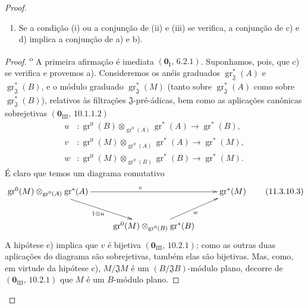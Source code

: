 \begin{proof}
\begin{lemma}[11.3.10.2]
\begin{enumerate}[label=\arabic{enumi}\textsuperscript{o}]

\item Se a condição (i) ou a conjunção
de (ii) e (iii) se verifica, a
conjunção de c) e d) implica a
conjunção de a) e b).
\end{enumerate}
\end{lemma}

\begin{proof}
\textsuperscript{o} A primeira
afirmação é imediata
$(\mathbf 0_{\mathrm I},\,6.2.1)$.
Suponhamos, pois, que c) se verifica
e provemos a). Consideremos os anéis
graduados $\operatorname{gr}_{\mathfrak J}^*(A)$
e $\operatorname{gr}_{\mathfrak J}^*(B)$,
e o módulo graduado
$\operatorname{gr}_{\mathfrak J}^*(M)$
(tanto sobre $\operatorname{gr}_{\mathfrak J}^*(A)$
como sobre $\operatorname{gr}_{\mathfrak J}^*(B)$),
relativos às filtrações
$\mathfrak J$-pré-ádicas, bem como as
aplicações canônicas sobrejetivas
$(\mathbf 0_{\mathrm{III}},\,10.1.1.2)$
\begin{align*}
u&:\operatorname{gr}^0(B)
\otimes_{\operatorname{gr}^0(A)}
\operatorname{gr}^*(A)
\longrightarrow\operatorname{gr}^*(B),\\
v&:\operatorname{gr}^0(M)
\otimes_{\operatorname{gr}^0(A)}
\operatorname{gr}^*(A)
\longrightarrow\operatorname{gr}^*(M),\\
w&:\operatorname{gr}^0(M)
\otimes_{\operatorname{gr}^0(B)}
\operatorname{gr}^*(B)
\longrightarrow\operatorname{gr}^*(M).
\end{align*}
É claro que temos um diagrama comutativo
\begin{equation}
\xymatrix{
\operatorname{gr}^0(M)
\otimes_{\operatorname{gr}^0(A)}
\operatorname{gr}^*(A)
\ar[rr]^v\ar[dr]_{1\otimes u}
&&\operatorname{gr}^*(M)\\
&\operatorname{gr}^0(M)
\otimes_{\operatorname{gr}^0(B)}
\operatorname{gr}^*(B)\ar[ur]_w&
}
\label{IV.11.3.10.3}
\tag{11.3.10.3}
\end{equation}
A hipótese c) implica que $v$ é bijetiva
$(\mathbf 0_{\mathrm{III}},\,10.2.1)$;
como as outras duas aplicações do diagrama
são sobrejetivas, também elas são
bijetivas. Mas, como, em virtude da
hipótese c), $M/\mathfrak JM$ é um
$(B/\mathfrak JB)$-módulo plano,
decorre de $(\mathbf 0_{\mathrm{III}},\,10.2.1)$
que $M$ é um $B$-módulo plano.


\end{proof}
\end{proof}

